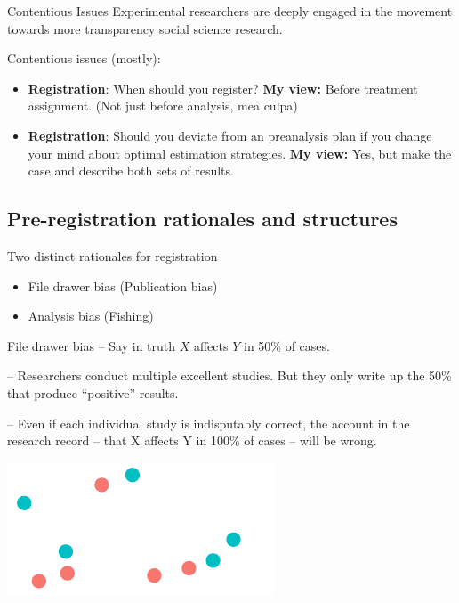 \documentclass[
  11pt,
  ignorenonframetext,
]{beamer}
\begin{document}
\begin{frame}{Contentious Issues}
\protect\hypertarget{contentious-issues-3}{}
Experimental researchers are deeply engaged in the movement towards more
transparency social science research.

Contentious issues (mostly):

\begin{itemize}
\item
  \textbf{Registration}: When should you register? \textbf{My view:}
  Before treatment assignment. (Not just before analysis, mea culpa)
\item
  \textbf{Registration}: Should you deviate from an preanalysis plan if
  you change your mind about optimal estimation strategies. \textbf{My
  view:} Yes, but make the case and describe both sets of results.
\end{itemize}
\end{frame}

\hypertarget{pre-registration-rationales-and-structures}{%
\subsection{Pre-registration rationales and
structures}\label{pre-registration-rationales-and-structures}}

\begin{frame}{Two distinct rationales for registration}
\protect\hypertarget{two-distinct-rationales-for-registration}{}
\begin{itemize}
\item
  File drawer bias (Publication bias)
\item
  Analysis bias (Fishing)
\end{itemize}
\end{frame}

\begin{frame}{File drawer bias}
\protect\hypertarget{file-drawer-bias}{}
-- Say in truth \(X\) affects \(Y\) in 50\% of cases.

-- Researchers conduct multiple excellent studies. But they only write
up the 50\% that produce ``positive'' results.

-- Even if each individual study is indisputably correct, the account in
the research record -- that X affects Y in 100\% of cases -- will be
wrong.

\includegraphics{0_lectures_files/figure-beamer/unnamed-chunk-533-1.pdf}
\end{frame}
\end{document}
